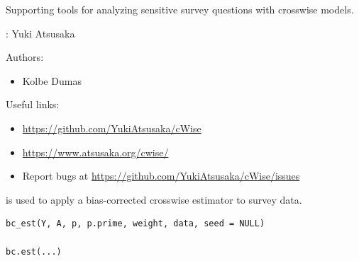 \documentclass[a4paper]{book}
\begin{document}
%
\begin{Description}
Supporting tools for analyzing sensitive survey questions with crosswise
models.
\end{Description}
%
\begin{Author}
: Yuki Atsusaka 

Authors:
\begin{itemize}

\item{} Kolbe Dumas 

\end{itemize}


\end{Author}
%
\begin{SeeAlso}
Useful links:
\begin{itemize}

\item{} \url{https://github.com/YukiAtsusaka/cWise}
\item{} \url{https://www.atsusaka.org/cwise/}
\item{} Report bugs at \url{https://github.com/YukiAtsusaka/cWise/issues}

\end{itemize}


\end{SeeAlso}
%
\begin{Description}
 is used to apply a bias-corrected crosswise estimator to survey data.
\end{Description}
%
\begin{Usage}
\begin{verbatim}
bc_est(Y, A, p, p.prime, weight, data, seed = NULL)

bc.est(...)
\end{verbatim}
\end{Usage}
%
\end{document}
